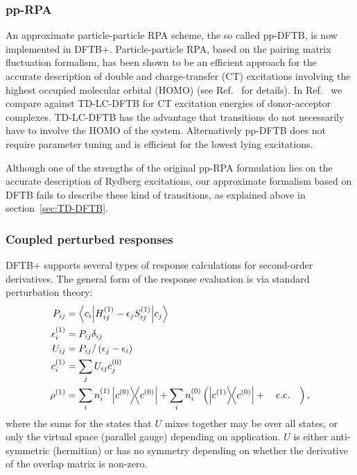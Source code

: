 \documentclass{revtex4-1}
\newcommand{\dftbp}{DFTB+}
\begin{document}
\subsubsection{pp-RPA}

An approximate particle-particle RPA scheme, the so called
pp-DFTB,\cite{Kranz2017} is now implemented in DFTB+. Particle-particle RPA,
based on the pairing matrix fluctuation formalism, has been shown to be an
efficient approach for the accurate description of double and charge-transfer
(CT) excitations involving the highest occupied molecular orbital (HOMO) (see
Ref.~ for details).  In Ref.~ we
compare against TD-LC-DFTB for CT excitation energies of donor-acceptor
complexes. TD-LC-DFTB has the advantage that transitions do not necessarily have
to involve the HOMO of the system. Alternatively pp-DFTB does not require
parameter tuning and is efficient for the lowest lying excitations.

Although one of the strengths of the original pp-RPA formulation lies on the
accurate description of Rydberg excitations, our approximate formalism based on
DFTB fails to describe these kind of transitions, as explained above in
section~\ref{sec:TD-DFTB}.

\subsubsection{Coupled perturbed responses}

\dftbp{} supports several types of response calculations for second-order
derivatives. The general form of the response evaluation is via standard
perturbation theory:
\begin{align}
  P_{ij} &= \mel**{c_i}{H^{(1)}_{ij} - \epsilon_j S^{(1)}_{ij}}{c_j}\\
  \epsilon_i^{(1)} &= P_{ij} \delta_{ij}\\
  U_{ij} &= P_{ij} / \left( \epsilon_j - \epsilon_i \right)\\
  c_i^{(1)} &= \sum_j U_{ij} c_j^{(0)}\\
  \rho^{(1)} &= \sum_i n^{(1)}_i \dyad{c^{(0)}} + \sum_i n^{(0)}_i \left(
               \dyad{c^{(1)}}{c^{(0)}} + \qcc\right),
\end{align}
where the sums for the states that $U$ mixes together may be over all states, or only
the virtual space (parallel gauge) depending on application. $U$ is either
anti-symmetric (hermitian) or has no symmetry depending on whether the derivative
of the overlap matrix is non-zero.
\end{document}
